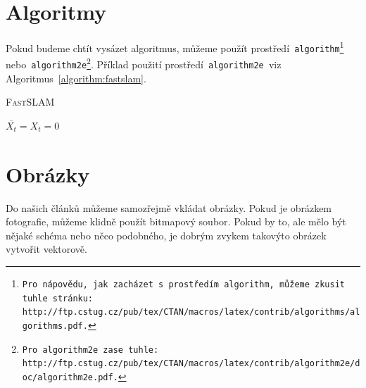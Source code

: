 \documentclass[a4paper, 11pt]{article}
\begin{document}
\bigskip
{}

\pagebreak

\section{Algoritmy}
\label{section:algoritmy}
Pokud budeme chtít vysázet algoritmus, můžeme použít prostředí\texttt{ algorithm\footnote{Pro nápovědu, jak zacházet s~prostředím\texttt{ algorithm,} můžeme zkusit tuhle stránku: \\
http://ftp.cstug.cz/pub/tex/CTAN/macros/latex/contrib/algorithms/algorithms.pdf.} }
nebo\texttt{ algorithm2e\footnote{Pro\texttt{ algorithm2e }zase tuhle: http://ftp.cstug.cz/pub/tex/CTAN/macros/latex/contrib/algorithm2e/doc/algorithm2e.pdf.}}.
Příklad použití prostředí\texttt{ algorithm2e }viz Algoritmus~\ref{algorithm:fastslam}. \\

\IncMargin{1.5em}
\begin{algorithm}
	\caption{\textsc{FastSLAM}}
    \label{algorithm:fastslam}
    \SetNlSty{}{}{:}
    \SetNlSkip{0.4em}
    \SetInd{1em}{1em}
    \Indm\Indmm
    \Indp\Indpp
    \BlankLine
    $ \overline{X_t} = X_t = 0 $ \\
        

\end{algorithm}
\DecMargin{1.5em}

\section{Obrázky}
     	Do našich článků můžeme samozřejmě vkládat obrázky. Pokud je obrázkem fotografie,
        můžeme klidně použít bitmapový soubor. Pokud by to, ale mělo být nějaké schéma nebo
        něco podobného, je dobrým zvykem takovýto obrázek vytvořit vektorově.
        
\end{document}
